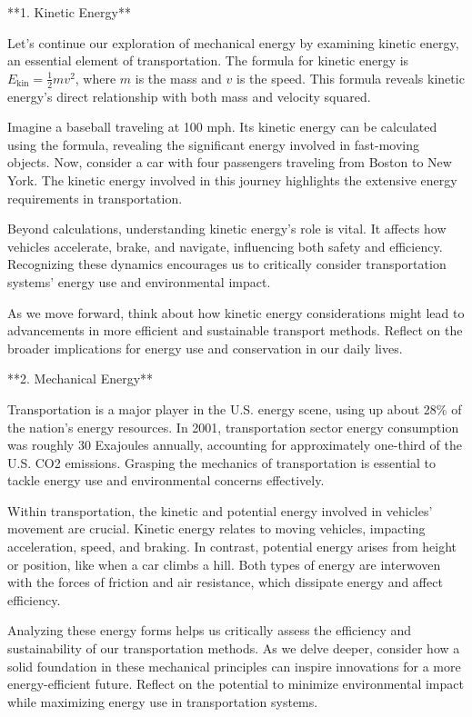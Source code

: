 \noindent
\textbf{}

\begin{tcolorbox}[size=title,opacityfill=0.05,breakable]
\noindent
**1. Kinetic Energy**

Let's continue our exploration of mechanical energy by examining kinetic energy, an essential element of transportation. The formula for kinetic energy is \( E_{\text{kin}} = \frac{1}{2}mv^2 \), where \( m \) is the mass and \( v \) is the speed. This formula reveals kinetic energy's direct relationship with both mass and velocity squared.

Imagine a baseball traveling at 100 mph. Its kinetic energy can be calculated using the formula, revealing the significant energy involved in fast-moving objects. Now, consider a car with four passengers traveling from Boston to New York. The kinetic energy involved in this journey highlights the extensive energy requirements in transportation.

Beyond calculations, understanding kinetic energy's role is vital. It affects how vehicles accelerate, brake, and navigate, influencing both safety and efficiency. Recognizing these dynamics encourages us to critically consider transportation systems' energy use and environmental impact.

As we move forward, think about how kinetic energy considerations might lead to advancements in more efficient and sustainable transport methods. Reflect on the broader implications for energy use and conservation in our daily lives.

**2. Mechanical Energy**

Transportation is a major player in the U.S. energy scene, using up about 28\% of the nation's energy resources. In 2001, transportation sector energy consumption was roughly 30 Exajoules annually, accounting for approximately one-third of the U.S. CO2 emissions. Grasping the mechanics of transportation is essential to tackle energy use and environmental concerns effectively.

Within transportation, the kinetic and potential energy involved in vehicles' movement are crucial. Kinetic energy relates to moving vehicles, impacting acceleration, speed, and braking. In contrast, potential energy arises from height or position, like when a car climbs a hill. Both types of energy are interwoven with the forces of friction and air resistance, which dissipate energy and affect efficiency.

Analyzing these energy forms helps us critically assess the efficiency and sustainability of our transportation methods. As we delve deeper, consider how a solid foundation in these mechanical principles can inspire innovations for a more energy-efficient future. Reflect on the potential to minimize environmental impact while maximizing energy use in transportation systems.


\end{tcolorbox}

